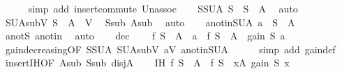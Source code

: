 \begin{isabellebody}
\ \ \ \ \isamarkupfalse%
\ {\isacharparenleft}{\kern0pt}simp\ add{\isacharcolon}{\kern0pt}\ insert{\isacharunderscore}{\kern0pt}commute\ Un{\isacharunderscore}{\kern0pt}assoc{\isacharparenright}{\kern0pt}\isanewline
\isanewline
\ \ \isamarkupfalse%
\ SSUA{\isacharcolon}{\kern0pt}\ {\isachardoublequoteopen}S\ {\isasymsubseteq}\ S\ {\isasymunion}\ A{\isachardoublequoteclose}\ \isamarkupfalse%
\ auto\isanewline
\ \ \isamarkupfalse%
\ SUA{\isacharunderscore}{\kern0pt}subV{\isacharcolon}{\kern0pt}\ {\isachardoublequoteopen}S\ {\isasymunion}\ A\ {\isasymsubseteq}\ V{\isachardoublequoteclose}\ \isamarkupfalse%
\ S{\isacharunderscore}{\kern0pt}sub\ A{\isacharunderscore}{\kern0pt}sub\ \isamarkupfalse%
\ auto\isanewline
\ \ \isamarkupfalse%
\ a{\isacharunderscore}{\kern0pt}notin{\isacharunderscore}{\kern0pt}SUA{\isacharcolon}{\kern0pt}\ {\isachardoublequoteopen}a\ {\isasymnotin}\ S\ {\isasymunion}\ A{\isachardoublequoteclose}\ \isamarkupfalse%
\ a{\isacharunderscore}{\kern0pt}notS\ a{\isacharunderscore}{\kern0pt}notin\ \isamarkupfalse%
\ auto\isanewline
\ \ \isamarkupfalse%
\ dec{\isacharcolon}{\kern0pt}\isanewline
\ \ \ \ {\isachardoublequoteopen}f\ {\isacharparenleft}{\kern0pt}{\isacharparenleft}{\kern0pt}S\ {\isasymunion}\ A{\isacharparenright}{\kern0pt}\ {\isasymunion}\ {\isacharbraceleft}{\kern0pt}a{\isacharbraceright}{\kern0pt}{\isacharparenright}{\kern0pt}\ {\isacharminus}{\kern0pt}\ f\ {\isacharparenleft}{\kern0pt}S\ {\isasymunion}\ A{\isacharparenright}{\kern0pt}\ {\isasymle}\ gain\ S\ a{\isachardoublequoteclose}\isanewline
\ \ \ \ \isamarkupfalse%
\ gain{\isacharunderscore}{\kern0pt}decreasing{\isacharbrackleft}{\kern0pt}OF\ SSUA\ SUA{\isacharunderscore}{\kern0pt}subV\ aV\ a{\isacharunderscore}{\kern0pt}notin{\isacharunderscore}{\kern0pt}SUA{\isacharbrackright}{\kern0pt}\isanewline
\ \ \ \ \isamarkupfalse%
\ {\isacharparenleft}{\kern0pt}simp\ add{\isacharcolon}{\kern0pt}\ gain{\isacharunderscore}{\kern0pt}def{\isacharparenright}{\kern0pt}\isanewline
\isanewline
\ \ \isamarkupfalse%
\ insert{\isachardot}{\kern0pt}IH{\isacharbrackleft}{\kern0pt}OF\ A{\isacharunderscore}{\kern0pt}sub\ S{\isacharunderscore}{\kern0pt}sub\ disjA{\isacharbrackright}{\kern0pt}\isanewline
\ \ \isamarkupfalse%
\ IH{\isacharcolon}{\kern0pt}\ {\isachardoublequoteopen}f\ {\isacharparenleft}{\kern0pt}S\ {\isasymunion}\ A{\isacharparenright}{\kern0pt}\ {\isacharminus}{\kern0pt}\ f\ S\ {\isasymle}\ {\isacharparenleft}{\kern0pt}{\isasymSum}x{\isasymin}A{\isachardot}{\kern0pt}\ gain\ S\ x{\isacharparenright}{\kern0pt}{\isachardoublequoteclose}\ \isakeywordONE{{\isachardot}{\kern0pt}}\isamarkupfalse%

\end{isabellebody}
